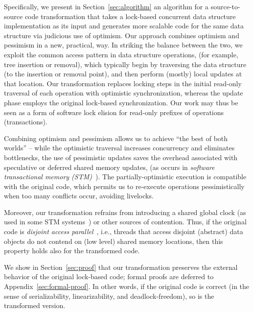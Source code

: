 Specifically, we present in Section~\ref{sec:algorithm} an algorithm for a source-to-source
code transformation that takes a lock-based concurrent data structure implementation as its input
and generates more scalable code for the same data structure via judicious use of optimism.
Our approach combines optimism and pessimism in a new, practical, way.
In striking the balance between the two, we exploit the common access pattern in data structure operations,
(for example, tree insertion or removal), which typically begin by traversing the data structure (to the insertion or removal point), and then perform (mostly) local updates at that location.
Our transformation replaces locking steps in the initial read-only traversal of each operation with
optimistic synchronization, whereas the update phase employs the original lock-based synchronization.
Our work may thus be seen as a form of software lock elision for read-only prefixes of operations (transactions).

Combining optimism and pessimism allows us to achieve ``the best of both worlds'' -- while the
optimistic traversal increases concurrency and eliminates bottlenecks,
the use of pessimistic updates saves the overhead associated with speculative or deferred shared
memory updates, (as occurs in \emph{software transactional memory (STM)}~\cite{HLR:SLCA2010}).
The partially-optimistic execution is compatible with the original code, which permits us to re-execute operations
pessimistically when too many conflicts occur, avoiding livelocks.

Moreover, our transformation
refrains from introducing a shared global clock (as used in some STM systems~\cite{DBLP:conf/eurosys/ShalevS06}) or other sources of contention. 
Thus, if the original code is \emph{disjoint access parallel}~\cite{Israeli:1994:DIS:197917.198079}, i.e., threads
that access disjoint (abstract) data objects do not contend on (low level) shared memory locations, then this
property holds also for the transformed code.

We show in Section~\ref{sec:proof} that our transformation preserves the external behavior of the original lock-based code; formal proofs are deferred to Appendix~\ref{sec:formal-proof}.
In other words, if the original code is correct (in the sense of serializability, linearizability, and deadlock-freedom), so is the
transformed version. 


